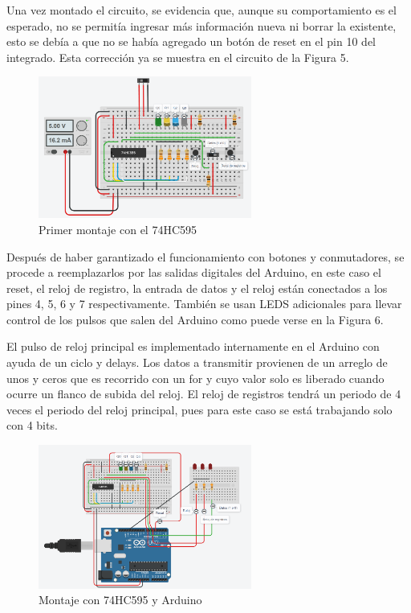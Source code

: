 \documentclass{article}
\begin{document}
Una vez montado el circuito, se evidencia que, aunque su comportamiento es el esperado, no se permitía ingresar más información nueva ni borrar la existente, esto se debía a que no se había agregado un botón de reset en el pin 10 del integrado. Esta corrección ya se muestra en el circuito de la Figura 5.\\

\begin{figure}[ht]
\includegraphics[width=7cm]{montaje0.PNG}
\centering
\caption{Primer montaje con el 74HC595}
\end{figure}

Después de haber garantizado el funcionamiento con botones y conmutadores, se procede a reemplazarlos por las salidas digitales del Arduino, en este caso el reset, el reloj de registro, la entrada de datos y el reloj están conectados a los pines 4, 5, 6 y 7 respectivamente. También se usan LEDS adicionales para llevar control de los pulsos que salen del Arduino como puede verse en la Figura 6.

El pulso de reloj principal es implementado internamente en el Arduino con ayuda de un ciclo y delays. Los datos a transmitir provienen de un arreglo de unos y ceros que es recorrido con un for y cuyo valor solo es liberado  cuando ocurre un flanco de subida del reloj. El reloj de registros tendrá un periodo de 4 veces el periodo del reloj principal, pues para este caso se está trabajando solo con 4 bits.


\begin{figure}[!ht] 
\includegraphics[width=7cm]{montaje1.PNG}
\centering
\caption{Montaje con 74HC595 y Arduino}
\end{figure}
\end{document}
